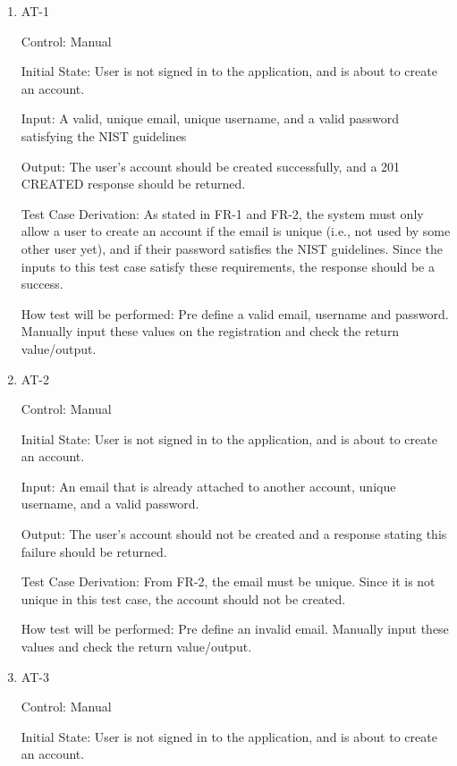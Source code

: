 \documentclass[12pt, titlepage]{article}
\begin{document}
\begin{enumerate}

\item{AT-1\\}

Control: Manual
					
Initial State: User is not signed in to the application, and is about to create an account.
					
Input: A valid, unique email, unique username, and a valid password satisfying the NIST guidelines
					
Output: The user's account should be created successfully, and a 201 CREATED response should be returned.

Test Case Derivation: As stated in FR-1 and FR-2, the system must only allow a user to create an account if the email is unique (i.e., not 
used by some other user yet), and if their password satisfies the NIST guidelines. Since the inputs to this test case satisfy these 
requirements, the response should be a success.
					
How test will be performed: Pre define a valid email, username and password. Manually input these values on the registration and check the return value/output.
					
\item{AT-2\\}

Control: Manual
					
Initial State: User is not signed in to the application, and is about to create an account.
					
Input: An email that is already attached to another account, unique username, and a valid password.
					
Output: The user's account should not be created and a response stating this failure should be returned.

Test Case Derivation: From FR-2, the email must be unique. Since it is not unique in this test case, the account should not 
be created.

How test will be performed: Pre define an invalid email. Manually input these values and check the return value/output.

\item{AT-3\\}

Control: Manual
					
Initial State: User is not signed in to the application, and is about to create an account.
					

\end{enumerate}
\end{document}
